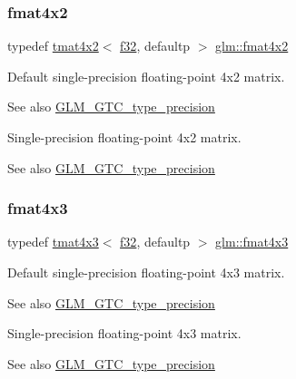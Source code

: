 \subsubsection{\texorpdfstring{fmat4x2}{fmat4x2}}
{\footnotesize\ttfamily typedef \hyperlink{structglm_1_1tmat4x2}{tmat4x2}$<$ \hyperlink{group__gtc__type__precision_ga0ec999b57f5330d9021256e96038df04}{f32}, defaultp $>$ \hyperlink{group__gtc__type__precision_ga9325d382b334066a4c90a814c9040359}{glm\+::fmat4x2}}

Default single-\/precision floating-\/point 4x2 matrix. \begin{DoxySeeAlso}{See also}
\hyperlink{group__gtc__type__precision}{G\+L\+M\+\_\+\+G\+T\+C\+\_\+type\+\_\+precision}
\end{DoxySeeAlso}
Single-\/precision floating-\/point 4x2 matrix. \begin{DoxySeeAlso}{See also}
\hyperlink{group__gtc__type__precision}{G\+L\+M\+\_\+\+G\+T\+C\+\_\+type\+\_\+precision} 
\end{DoxySeeAlso}
\mbox{\label{group__gtc__type__precision_ga89195b7b13a41b0f1d34a962d1f66bfb}} 
\subsubsection{\texorpdfstring{fmat4x3}{fmat4x3}}
{\footnotesize\ttfamily typedef \hyperlink{structglm_1_1tmat4x3}{tmat4x3}$<$ \hyperlink{group__gtc__type__precision_ga0ec999b57f5330d9021256e96038df04}{f32}, defaultp $>$ \hyperlink{group__gtc__type__precision_ga89195b7b13a41b0f1d34a962d1f66bfb}{glm\+::fmat4x3}}

Default single-\/precision floating-\/point 4x3 matrix. \begin{DoxySeeAlso}{See also}
\hyperlink{group__gtc__type__precision}{G\+L\+M\+\_\+\+G\+T\+C\+\_\+type\+\_\+precision}
\end{DoxySeeAlso}
Single-\/precision floating-\/point 4x3 matrix. \begin{DoxySeeAlso}{See also}
\hyperlink{group__gtc__type__precision}{G\+L\+M\+\_\+\+G\+T\+C\+\_\+type\+\_\+precision} 
\end{DoxySeeAlso}
\mbox{\label{group__gtc__type__precision_ga16b508b75c7213ba6b24055ff3b7503d}} 
